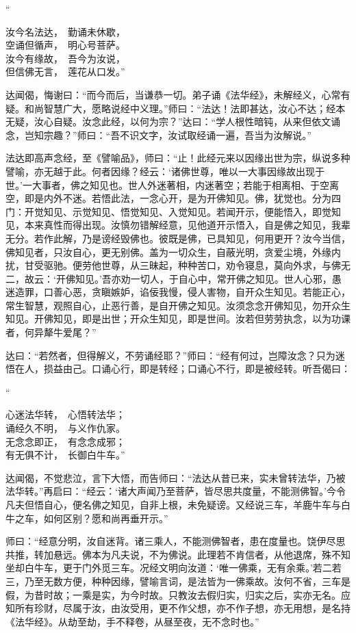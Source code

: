\documentclass[UTF8, 11pt, oneside]{ctexart}
\newenvironment{jizi}[1]{
    \vspace{-1em}\begin{center}
        #1%
        \begin{varwidth}[t]{\linewidth}
}{
        \end{varwidth}
    \end{center}
}
\begin{document}
\begin{jizi}{“}
    汝今名法达，　勤诵未休歇， \\
    空诵但循声，　明心号菩萨。 \\
    汝今有缘故，　吾今为汝说， \\
    但信佛无言，　莲花从口发。”
\end{jizi}

达闻偈，悔谢曰：“而今而后，当谦恭一切。弟子诵《法华经》，未解经义，心常有疑。和尚智慧广大，愿略说经中义理。”师曰：“法达！法即甚达，汝心不达；经本无疑，汝心自疑。汝念此经，以何为宗？”达曰：“学人根性暗钝，从来但依文诵念，岂知宗趣？”师曰：“吾不识文字，汝试取经诵一遍，吾当为汝解说。”

法达即高声念经，至《譬喻品》，师曰：“止！此经元来以因缘出世为宗，纵说多种譬喻，亦无越于此。何者因缘？经云：‘诸佛世尊，唯以一大事因缘故出现于世。’一大事者，佛之知见也。世人外迷著相，内迷著空；若能于相离相、于空离空，即是内外不迷。若悟此法，一念心开，是为开佛知见。佛，犹觉也。分为四门：开觉知见、示觉知见、悟觉知见、入觉知见。若闻开示，便能悟入，即觉知见，本来真性而得出现。汝慎勿错解经意，见他道开示悟入，自是佛之知见，我辈无分。若作此解，乃是谤经毁佛也。彼既是佛，已具知见，何用更开？汝今当信，佛知见者，只汝自心，更无别佛。盖为一切众生，自蔽光明，贪爱尘境，外缘内扰，甘受驱驰。便劳他世尊，从三昧起，种种苦口，劝令寝息，莫向外求，与佛无二，故云：‘开佛知见。’吾亦劝一切人，于自心中，常开佛之知见。世人心邪，愚迷造罪，口善心恶，贪瞋嫉妒，谄佞我慢，侵人害物，自开众生知见。若能正心，常生智慧，观照自心，止恶行善，是自开佛之知见。汝须念念开佛知见，勿开众生知见。开佛知见，即是出世；开众生知见，即是世间。汝若但劳劳执念，以为功课者，何异犛牛爱尾？”

达曰：“若然者，但得解义，不劳诵经耶？”师曰：“经有何过，岂障汝念？只为迷悟在人，损益由己。口诵心行，即是转经；口诵心不行，即是被经转。听吾偈曰：

\begin{jizi}{“}
    心迷法华转，　心悟转法华； \\
    诵经久不明，　与义作仇家。 \\
    无念念即正，　有念念成邪； \\
    有无俱不计，　长御白牛车。”
\end{jizi}

达闻偈，不觉悲泣，言下大悟，而告师曰：“法达从昔已来，实未曾转法华，乃被法华转。”再启曰：“经云：‘诸大声闻乃至菩萨，皆尽思共度量，不能测佛智。’今令凡夫但悟自心，便名佛之知见，自非上根，未免疑谤。又经说三车，羊鹿牛车与白牛之车，如何区别？愿和尚再垂开示。”

师曰：“经意分明，汝自迷背。诸三乘人，不能测佛智者，患在度量也。饶伊尽思共推，转加悬远。佛本为凡夫说，不为佛说。此理若不肯信者，从他退席，殊不知坐却白牛车，更于门外觅三车。况经文明向汝道：‘唯一佛乘，无有余乘。’若二若三，乃至无数方便，种种因缘，譬喻言词，是法皆为一佛乘故。汝何不省，三车是假，为昔时故；一乘是实，为今时故。只教汝去假归实，归实之后，实亦无名。应知所有珍财，尽属于汝，由汝受用，更不作父想，亦不作子想，亦无用想，是名持《法华经》。从劫至劫，手不释卷，从昼至夜，无不念时也。”
\end{document}
